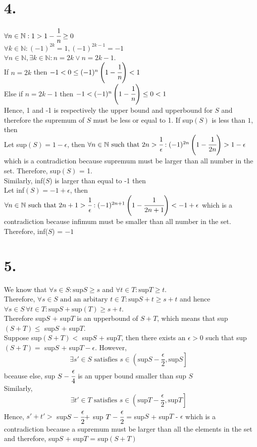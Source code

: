 \documentclass[11pt]{article}
\begin{document}
\pagebreak
\section*{4.}
$\forall n \in \mathbb{N}: 1>1- \cfrac{1}{n} \ge 0 $\\
$\forall k \in \mathbb{N}: (-1)^{2k} = 1, (-1)^{2k-1} = -1$ \\
$\forall n \in \mathbb{N}, \exists k \in \mathbb{N}: n = 2k \lor n = 2k-1$. \\
If $n = 2k$ then $-1 < 0 \le(-1)^{n} \left(1-\cfrac{1}{n}\right)<1$ \\
Else if $n = 2k-1$ then $-1<(-1)^{n} \left(1-\cfrac{1}{n}\right)\le 0 <1$ \\
Hence, 1 and -1 is respectively the upper bound and upperbound for $S$
and therefore the supremum of $S$ must be less or equal to 1. If sup$(S)$ is less than $1$, then \\
Let sup$(S) = 1 - \epsilon$, then  $\forall n \in \mathbb{N} \text{ such that } 2n>\cfrac{1}{\epsilon}: (-1)^{2n} \left(1- \cfrac{1}{2n}\right) > 1 - \epsilon$ which is a contradiction because supremum must be larger than all number in the set. Therefore, sup$(S)$ = 1. \\
Similarly, inf($S$) is larger than equal to -1 then \\
Let inf$(S) = -1 + \epsilon$, then  $\forall n \in \mathbb{N} \text{ such that } 2n+1>\cfrac{1}{\epsilon}: (-1)^{2n+1}\left(1- \cfrac{1}{2n+1} \right) < -1 + \epsilon$ which is a contradiction because infimum must be smaller than all number in the set. Therefore, inf($S$) = $-1$ \\






\pagebreak
\section*{5.}
We know that $\forall s \in S: \text{sup}S \ge s$ and $\forall t \in T: \text{sup}T \ge t$. \\
Therefore, $\forall s \in S \text{ and an arbitary } t \in T: \text{sup}S + t \ge s + t$ and hence $\forall s \in S \,\forall t \in T: \text{sup}S + \text{sup}(T) \ge s + t$. \\
Therefore sup$S$ + sup$T$ is an upperbound of $S+T$, which means that sup$(S+T) \le$ sup$S$ + sup$T$. \\
Suppose sup$(S+T) <$ sup$S$ + sup$T$, then there exists an $\epsilon >0$ such that sup$(S+T) =$ sup$S$ + sup$T - \epsilon$. However,
\[
\exists s' \in S \text{ satisfies } s \in \left(\text{sup}S - \frac{\epsilon}{2}, \text{sup}S\right]
\]
bceause else, sup $S - \cfrac{\epsilon}{4}$ is an upper bound smaller than sup $S$ \\
Similarly, 
\[
\exists t' \in T \text{ satisfies } s \in \left(\text{sup}T - \frac{\epsilon}{2}, \text{sup}T\right]
\]
Hence, $s' + t' >$ sup$S - \cfrac{\epsilon}{2} +$ sup $T - \cfrac{\epsilon}{2}$ = sup$S$ + sup$T$ - $\epsilon$ which is a contradiction because a supremum must be larger than all the elements in the set and therefore, sup$S$ + sup$T$ = sup$(S+T)$
\end{document}
